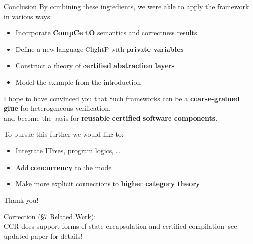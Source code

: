 \documentclass[aspectratio=1610,mathserif]{beamer}
\begin{document}
\begin{frame}{Conclusion} %
  By combining these ingredients,
  we were able to apply the framework in various ways:
  \begin{itemize}
    \pause
    \item Incorporate \textbf{CompCertO} semantics and correctness results
    \pause
    \item Define a new language ClightP with \textbf{private variables}
    \pause
    \item Construct a theory of \textbf{certified abstraction layers}
    \pause
    \item Model the example from the introduction
  \end{itemize}

  \pause
  I hope to have convinced you that
    Such frameworks can be a
    \textbf{coarse-grained glue} for heterogeneous verification, \\
    and become the basis for
    \textbf{reusable certified software components}.

  \pause
  To pursue this further we would like to:
  \begin{itemize}
    \item Integrate ITrees, program logics, \ldots
    \pause
    \item Add \textbf{concurrency} to the model
    \pause
    \item Make more explicit connections to \textbf{higher category theory}
  \end{itemize}
\end{frame}

\begin{frame} %
  \vspace{8em}
  \begin{center}
    \Large
    Thank you!
  \end{center}
  \vspace{8em}
  \footnotesize
  Correction (\S{}7 Related Work): \\
    CCR does support forms of state encapsulation and certified compilation;
    see updated paper for details!
\end{frame}

\appendix
\end{document}
